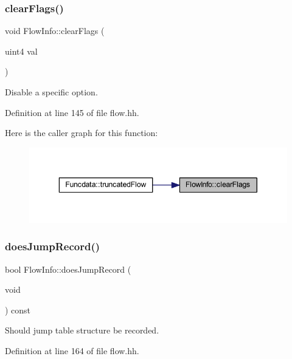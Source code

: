 \subsubsection{\texorpdfstring{clearFlags()}{clearFlags()}}
{\footnotesize\ttfamily void Flow\+Info\+::clear\+Flags (\begin{DoxyParamCaption}\item[{uint4}]{val }\end{DoxyParamCaption})\hspace{0.3cm}{\ttfamily [inline]}}



Disable a specific option. 



Definition at line 145 of file flow.\+hh.

Here is the caller graph for this function\+:
\nopagebreak
\begin{figure}[H]
\begin{center}
\leavevmode
\includegraphics[width=343pt]{class_flow_info_a9484944b8fee15fc9a85ce26c4f878ae_icgraph}
\end{center}
\end{figure}
\mbox{\label{class_flow_info_a62850410634545f7feeb7fd08ca1814c}} 
\subsubsection{\texorpdfstring{doesJumpRecord()}{doesJumpRecord()}}
{\footnotesize\ttfamily bool Flow\+Info\+::does\+Jump\+Record (\begin{DoxyParamCaption}\item[{void}]{ }\end{DoxyParamCaption}) const\hspace{0.3cm}{\ttfamily [inline]}}



Should jump table structure be recorded. 



Definition at line 164 of file flow.\+hh.

